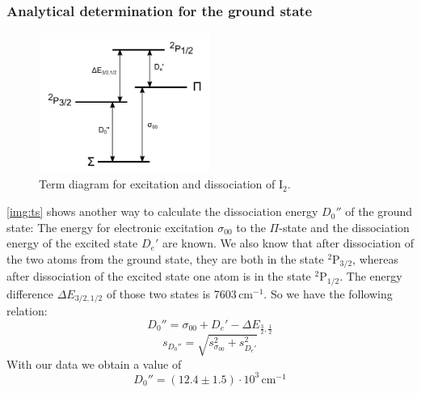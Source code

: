 \subsubsection{Analytical determination for the ground state}

\begin{figure}[H]
\begin{center}
  \includegraphics[width=0.5\textwidth]{../img/termschema.pdf}
  \caption[---]{Term diagram for excitation and dissociation of I$_2$.}
  \label{img:ts}
\end{center}
\end{figure}

\autoref{img:ts} shows another way to calculate the dissociation energy $D_0''$ of the ground state:
The energy for electronic excitation $\sigma_{00}$ to the $\Pi$-state and the dissociation energy of the
excited state $D_e'$ are known. We also know that after dissociation of the two atoms from
the ground state, they are both in the state ${}^2\text{P}_{3/2}$,
whereas after dissociation of the excited state one atom is in the state ${}^2\text{P}_{1/2}$.
The energy difference $\Delta E_{3/2,1/2}$ of those two states is 7603\,cm${}^{-1}$.
So we have the following relation:
\begin{equation}
  D_0''=\sigma_{00}+D_e'-\Delta E_{\frac{3}{2},\frac{1}{2}}
\end{equation}
\begin{equation}
  s_{D_0''}=\sqrt{s_{\sigma_{00}}^2+s_{D_e'}^2}
\end{equation}
With our data we obtain a value of
\begin{equation}
  D_0''=(12.4 \pm 1.5) \cdot 10^3 \, \text{cm}^{-1}
\end{equation}
